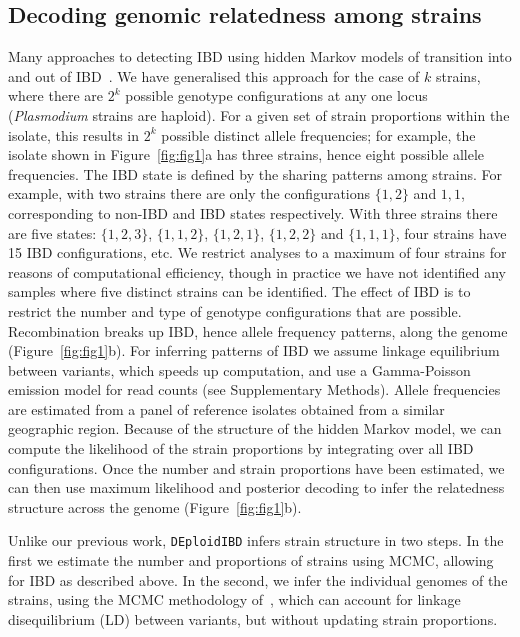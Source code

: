 \documentclass[9pt,lineno]{elife}
\begin{document}
\subsection{Decoding genomic relatedness among strains}

Many approaches to detecting IBD using hidden Markov models of transition into and out of IBD~\citep{Chang2015, Gusev2009, Gusev2011}.  We have generalised this approach for the case of $k$ strains, where there are $2^k$ possible genotype configurations at any one locus ({\it Plasmodium} strains are haploid).  For a given set of strain proportions within the isolate, this results in $2^k$ possible distinct allele frequencies; for example, the isolate shown in Figure~\ref{fig:fig1}a has three strains, hence eight possible allele frequencies.  The IBD state is defined by the sharing patterns among strains.  For example, with two strains there are only the configurations $\{1,2\}$ and ${1,1}$, corresponding to non-IBD and IBD states respectively.  With three strains there are five states: $\{1,2,3\}$, $\{1,1,2\}$, $\{1,2,1\}$, $\{1,2,2\}$ and $\{1,1,1\}$, four strains have 15 IBD configurations, etc.  We restrict analyses to a maximum of four strains for reasons of computational efficiency, though in practice we have not identified any samples where five distinct strains can be identified.  The effect of IBD is to restrict the number and type of genotype configurations that are possible.  Recombination breaks up IBD, hence allele frequency patterns, along the genome (Figure~\ref{fig:fig1}b).  For inferring patterns of IBD we assume linkage equilibrium between variants, which speeds up computation, and use a Gamma-Poisson emission model for read counts (see Supplementary Methods).  Allele frequencies are estimated from a panel of reference isolates obtained from a similar geographic region.  Because of the structure of the hidden Markov model, we can compute the likelihood of the strain proportions by integrating over all IBD configurations.  Once the number and strain proportions have been estimated, we can then use maximum likelihood and posterior decoding to infer the relatedness structure across the genome (Figure~\ref{fig:fig1}b).

Unlike our previous work, \texttt{DEploidIBD} infers strain structure in two steps.  In the first we estimate the number and proportions of strains using MCMC, allowing for IBD as described above.  In the second, we infer the individual genomes of the strains, using the MCMC methodology of~\citet{Zhu2017}, which can account for linkage disequilibrium (LD) between variants, but without updating strain proportions.
\end{document}
